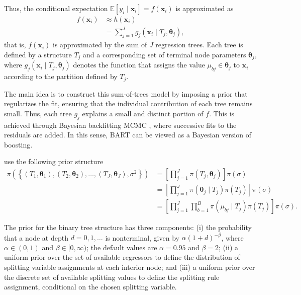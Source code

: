 Thus, the conditional expectation \( \mathbb{E}[y_i \mid \mathbf{x}_i] = f(\mathbf{x}_i) \) is approximated as
\begin{align*}
	f(\mathbf{x}_i) & \approx h(\mathbf{x}_i) \nonumber \\
	&= \sum_{j=1}^J g_j(\mathbf{x}_i \mid T_j, \boldsymbol{\theta}_j),
\end{align*}
that is, \( f(\mathbf{x}_i) \) is approximated by the sum of \( J \) regression trees. Each tree is defined by a structure \( T_j \) and a corresponding set of terminal node parameters \( \boldsymbol{\theta}_j \), where \( g_j(\mathbf{x}_i \mid T_j, \boldsymbol{\theta}_j) \) denotes the function that assigns the value \( \mu_{bj} \in \boldsymbol{\theta}_j \) to \( \mathbf{x}_i \) according to the partition defined by \( T_j \).

The main idea is to construct this sum-of-trees model by imposing a prior that regularizes the fit, ensuring that the individual contribution of each tree remains small. Thus, each tree \( g_j \) explains a small and distinct portion of \( f \). This is achieved through Bayesian backfitting MCMC \cite{hastie2000bayesian}, where successive fits to the residuals are added. In this sense, BART can be viewed as a Bayesian version of boosting.

\cite{chipman2010bart} use the following prior structure
\begin{align*}
	\pi(\left\{(T_1,\boldsymbol{\theta}_1),(T_2,\boldsymbol{\theta}_2),\dots, (T_J,\boldsymbol{\theta}_J),\sigma^2\right\})&=\left[\prod_{j=1}^J\pi(T_j,\boldsymbol{\theta}_j)\right]\pi(\sigma)\\
	&=\left[\prod_{j=1}^J\pi(\boldsymbol{\theta}_j\mid T_j)\pi(T_j)\right]\pi(\sigma)\\
	&=\left[\prod_{j=1}^J\prod_{b=1}^B\pi(\mu_{bj}\mid T_j)\pi(T_j)\right]\pi(\sigma).
\end{align*}  

The prior for the binary tree structure has three components: (i) the probability that a node at depth \( d = 0, 1, \dots \) is nonterminal, given by \( \alpha(1 + d)^{-\beta} \), where \( \alpha \in (0,1) \) and \( \beta \in [0, \infty) \); the default values are \( \alpha = 0.95 \) and \( \beta = 2 \); (ii) a uniform prior over the set of available regressors to define the distribution of splitting variable assignments at each interior node; and (iii) a uniform prior over the discrete set of available splitting values to define the splitting rule assignment, conditional on the chosen splitting variable.

